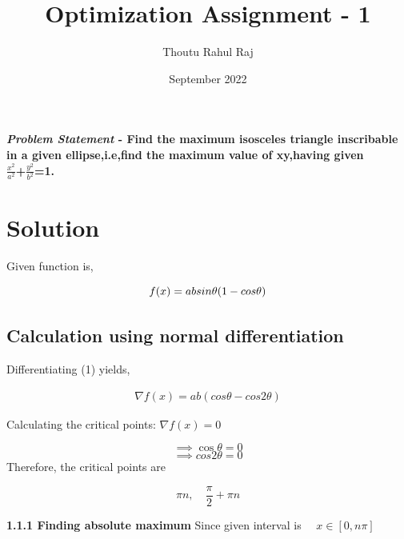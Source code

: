 \documentclass[10pt,twocolumn]{article}
\title{\textbf{Optimization Assignment - 1}}
\author{Thoutu Rahul Raj}
\date{September 2022}
\begin{document}
\maketitle
\paragraph{\textit{Problem Statement} - Find the maximum isosceles triangle inscribable in a given ellipse,i.e,find the maximum value of xy,having given\\
\large{$ \frac{x^2}{a^2}$+$\frac{y^2}{b^2}$=1.}\\
} 

\section{Solution}
\begin{flushleft}
Given function is,\\
\end{flushleft}
\begin{equation}
   f(x) = absin\theta(1-cos\theta)\\
\end{equation}
\subsection{Calculation using normal differentiation}
\begin{flushleft}
Differentiating (1) yields,
\end{flushleft}
\begin{align}
\nabla f(x) = ab(cos\theta-cos2\theta)
\end{align}

\noindent Calculating the critical points:
$ \nabla f(x) = 0 $

\begin{equation}
\implies \cos{\theta} = 0 
\end{equation}
\begin{equation}
\implies cos2\theta = 0
\end{equation}
Therefore, the critical points are 

\begin{equation}
{\pi}{n},\quad\frac{\pi}{2}+{\pi}n
\end{equation}

\textbf{1.1.1 Finding absolute maximum} 
Since given interval is $\quad x \in [0,n\pi]$ 
\end{document}
